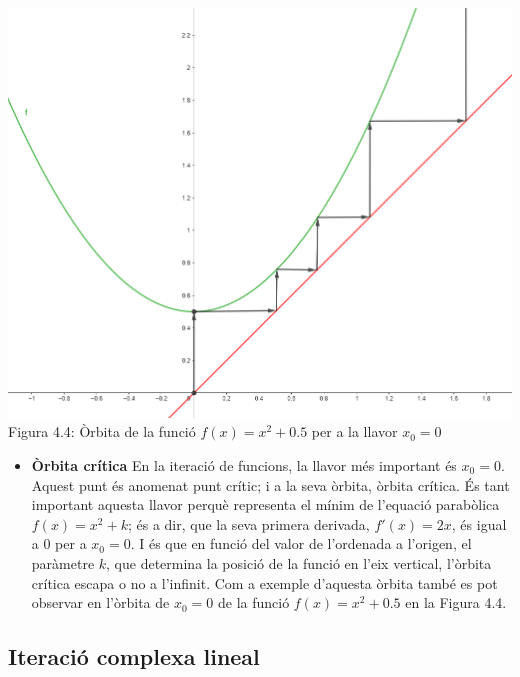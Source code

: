 \documentclass[12pt]{report}
\begin{document}
\begin{center}
   \hspace{3em} \includegraphics [width=0.6 \textwidth] {f(x)caotic.PNG}
    \newline
    Figura 4.4: Òrbita de la funció $f(x)=x^2+0.5$ per a la llavor $x_0=0$
\end{center}
\begin{itemize}
    \item \textbf{Òrbita crítica}
    \newline
    En la iteració de funcions, la llavor més important és $x_0=0$. Aquest punt és anomenat punt crític; i a la seva òrbita, òrbita crítica.
    \newline
    És tant important aquesta llavor perquè representa el mínim de l'equació parabòlica $f(x)= x^2+k$; és a dir, que la seva primera derivada, $f'(x)=2x$, és igual a 0 per a $x_0=0$. I és que en funció del valor de l'ordenada a l'origen, el paràmetre $k$, que determina la posició de la funció en l'eix vertical, l'òrbita crítica escapa o no a l'infinit.
    \newline 
    \newline 
    Com a exemple d'aquesta òrbita també es pot observar en l'òrbita de $x_0=0$ de la funció $f(x)=x^2+0.5$ en la Figura 4.4.
\end{itemize}
\subsection{Iteració complexa lineal}
\end{document}
